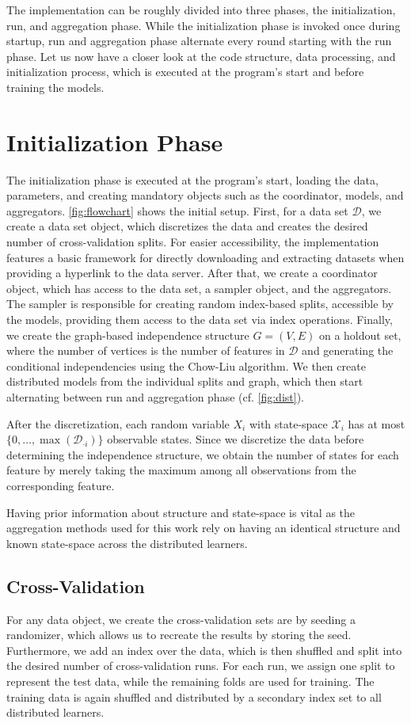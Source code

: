The implementation can be roughly divided into three phases, the initialization, run, and aggregation phase.
While the initialization phase is invoked once during startup, run and aggregation phase alternate every round starting with the run phase.
Let us now have a closer look at the code structure, data processing, and initialization process, which is executed at the program's start and before training the models. 

\section{Initialization Phase}

The initialization phase is executed at the program's start, loading the data, parameters, and creating mandatory objects such as the coordinator, models, and aggregators.
\autoref{fig:flowchart} shows the initial setup.
First, for a data set $\mathcal{D}$, we create a data set object, which discretizes the data and creates the desired number of cross-validation splits. 
For easier accessibility, the implementation features a basic framework for directly downloading and extracting datasets when providing a hyperlink to the data server.
After that, we create a coordinator object, which has access to the data set, a sampler object, and the aggregators.
The sampler is responsible for creating random index-based splits, accessible by the models, providing them access to the data set via index operations.
Finally, we create the graph-based independence structure $G=(V,E)$  on a holdout set, where the number of vertices is the number of features in $\mathcal{D}$ and generating the conditional independencies using the Chow-Liu algorithm.
We then create distributed models from the individual splits and graph, which then start alternating between run and aggregation phase (cf. \autoref{fig:dist}).

After the discretization, each random variable $X_i$ with state-space $\mathcal{X}_i$ has at most $\{0, \ldots, \max(\mathcal{D}_{\cdot i})\}$ observable states.
Since we discretize the data before determining the independence structure, we obtain the number of states for each feature by merely taking the maximum among all observations from the corresponding feature. 

Having prior information about structure and state-space is vital as the aggregation methods used for this work rely on having an identical structure and known state-space across the distributed learners.

\subsection{Cross-Validation}
For any data object, we create the cross-validation sets are by seeding a randomizer, which allows us to recreate the results by storing the seed.
Furthermore, we add an index over the data, which is then shuffled and split into the desired number of cross-validation runs.
For each run, we assign one split to represent the test data, while the remaining folds are used for training.
The training data is again shuffled and distributed by a secondary index set to all distributed learners.

